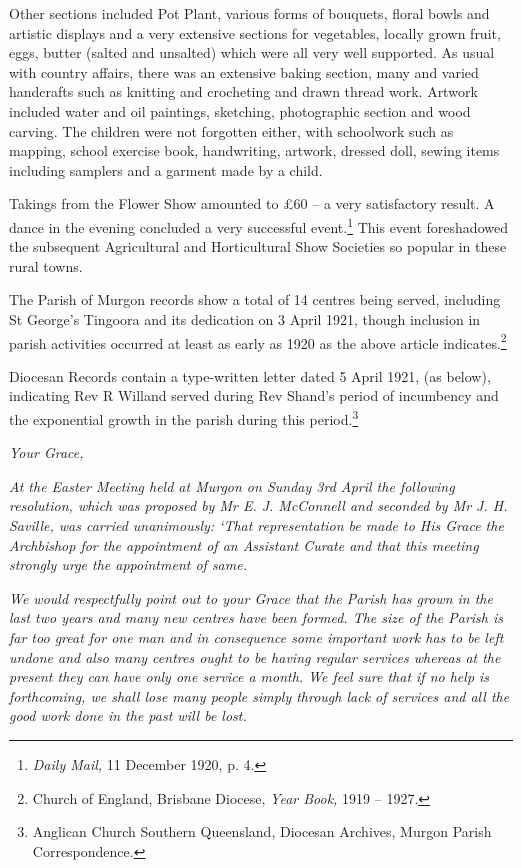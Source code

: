 Other sections included Pot Plant, various forms of bouquets, floral bowls and artistic displays and a very extensive sections for vegetables, locally grown fruit, eggs, butter (salted and unsalted) which were all very well supported. As usual with country affairs, there was an extensive baking section, many and varied handcrafts such as knitting and crocheting and drawn thread work. Artwork included water and oil paintings, sketching, photographic section and wood carving. The children were not forgotten either, with schoolwork such as mapping, school exercise book, handwriting, artwork, dressed doll, sewing items including samplers and a garment made by a child.



\balance


Takings from the Flower Show amounted to \pounds60 -- a very satisfactory result. A dance in the evening concluded a very successful event.\footnote{\emph{Daily Mail,} 11 December 1920, p. 4.} This event foreshadowed the subsequent Agricultural and Horticultural Show Societies so popular in these rural towns.


The Parish of Murgon records show a total of 14 centres being served, including St George's Tingoora and its dedication on 3 April 1921, though inclusion in parish activities occurred at least as early as 1920 as the above article indicates.\footnote{Church of England, Brisbane Diocese, \emph{Year Book,} 1919 -- 1927.}


Diocesan Records contain a type-written letter dated 5 April 1921, (as below), indicating Rev R Willand served during Rev Shand's period of incumbency and the exponential growth in the parish during this period.\footnote{Anglican Church Southern Queensland, Diocesan Archives, Murgon Parish Correspondence.}


\smallskip


\emph{Your Grace,}



\emph{At the Easter Meeting held at Murgon on Sunday 3rd April the following resolution, which was proposed by Mr E. J. McConnell and seconded by Mr J. H. Saville, was carried unanimously: `That representation be made to His Grace the Archbishop for the appointment of an Assistant Curate and that this meeting strongly urge the appointment of same.}



\emph{We would respectfully point out to your Grace that the Parish has grown in the last two years and many new centres have been formed. The size of the Parish is far too great for one man and in consequence some important work has to be left undone and also many centres ought to be having regular services whereas at the present they can have only one service a month. We feel sure that if no help is forthcoming, we shall lose many people simply through lack of services and all the good work done in the past will be lost.}



